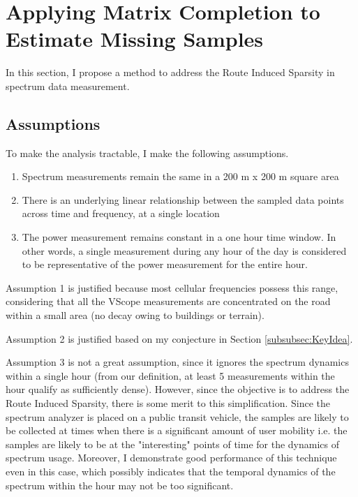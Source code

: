 
\section{Applying Matrix Completion to Estimate Missing Samples}

In this section, I propose a method to address the Route Induced Sparsity in spectrum data measurement.

\subsection{Assumptions}

To make the analysis tractable, I make the following assumptions.

\begin{enumerate}
\item Spectrum measurements remain the same in a 200 m x 200 m square area
\item There is an underlying linear relationship between the sampled data points across time and frequency, at a single location
\item The power measurement remains constant in a one hour time window. In other words, a single measurement during any hour of the day is considered to be representative of the power measurement for the entire hour. 
\end{enumerate}

Assumption 1 is justified because most cellular frequencies possess this range, considering that all the VScope measurements are concentrated on the road within a small area (no decay owing to buildings or terrain).

Assumption 2 is justified based on my conjecture in Section \ref{subsubsec:KeyIdea}.

Assumption 3 is not a great assumption, since it ignores the spectrum dynamics within a single hour (from our definition, at least 5 measurements within the hour qualify as sufficiently dense).
 However, since the objective is to address the Route Induced Sparsity, there is some merit to this simplification.
 Since the spectrum analyzer is placed on a public transit vehicle, the samples are likely to be collected at times when there is a significant amount of user mobility i.e. the samples are likely to be at the "interesting" points of time for the dynamics of spectrum usage.
 Moreover, I demonstrate good performance of this technique even in this case, which possibly indicates that the temporal dynamics of the spectrum within the hour may not be too significant.

